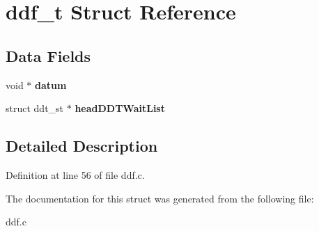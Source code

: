\hypertarget{structddf__t}{\section{ddf\-\_\-t Struct Reference}
\label{structddf__t}
}
\subsection*{Data Fields}
\begin{DoxyCompactItemize}
\item 
\hypertarget{structddf__t_a5eb509037229921dc52feda77028e0b0}{void $\ast$ {\bfseries datum}}\label{structddf__t_a5eb509037229921dc52feda77028e0b0}

\item 
\hypertarget{structddf__t_ae452e3d0c56652e5a679163bac3a3075}{struct ddt\-\_\-st $\ast$ {\bfseries head\-D\-D\-T\-Wait\-List}}\label{structddf__t_ae452e3d0c56652e5a679163bac3a3075}

\end{DoxyCompactItemize}


\subsection{Detailed Description}


Definition at line 56 of file ddf.\-c.



The documentation for this struct was generated from the following file\-:\begin{DoxyCompactItemize}
\item 
ddf.\-c\end{DoxyCompactItemize}
